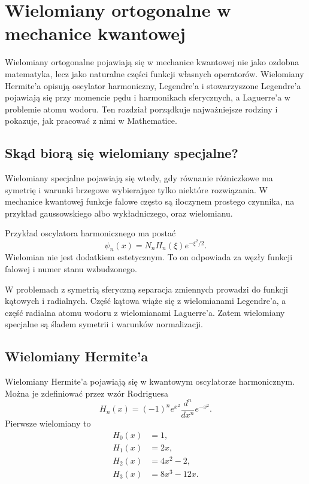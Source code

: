 \chapter{Wielomiany ortogonalne w mechanice kwantowej}

\begin{summarybox}
Wielomiany ortogonalne pojawiają się w mechanice kwantowej nie jako ozdobna
matematyka, lecz jako naturalne części funkcji własnych operatorów. Wielomiany
Hermite'a opisują oscylator harmoniczny, Legendre'a i stowarzyszone Legendre'a
pojawiają się przy momencie pędu i harmonikach sferycznych, a Laguerre'a w
problemie atomu wodoru. Ten rozdział porządkuje najważniejsze rodziny i pokazuje,
jak pracować z nimi w Mathematice.
\end{summarybox}

\section{Skąd biorą się wielomiany specjalne?}

Wielomiany specjalne pojawiają się wtedy, gdy równanie różniczkowe ma symetrię i warunki brzegowe wybierające tylko niektóre rozwiązania. W mechanice kwantowej funkcje falowe często są iloczynem prostego czynnika, na przykład gaussowskiego albo wykładniczego, oraz wielomianu.

Przykład oscylatora harmonicznego ma postać
\begin{equation}
    \psi_n(x)=N_n H_n(\xi)e^{-\xi^2/2}.
\end{equation}
Wielomian nie jest dodatkiem estetycznym. To on odpowiada za węzły funkcji falowej i numer stanu wzbudzonego.

W problemach z symetrią sferyczną separacja zmiennych prowadzi do funkcji kątowych i radialnych. Część kątowa wiąże się z wielomianami Legendre'a, a część radialna atomu wodoru z wielomianami Laguerre'a. Zatem wielomiany specjalne są śladem symetrii i warunków normalizacji.

\section{Wielomiany Hermite'a}

Wielomiany Hermite'a pojawiają się w kwantowym oscylatorze harmonicznym. Można je zdefiniować przez wzór Rodriguesa
\begin{equation}
    H_n(x)=(-1)^n e^{x^2}\frac{d^n}{dx^n}e^{-x^2}.
\end{equation}
Pierwsze wielomiany to
\begin{align}
    H_0(x)&=1,\\
    H_1(x)&=2x,\\
    H_2(x)&=4x^2-2,\\
    H_3(x)&=8x^3-12x.
\end{align}

